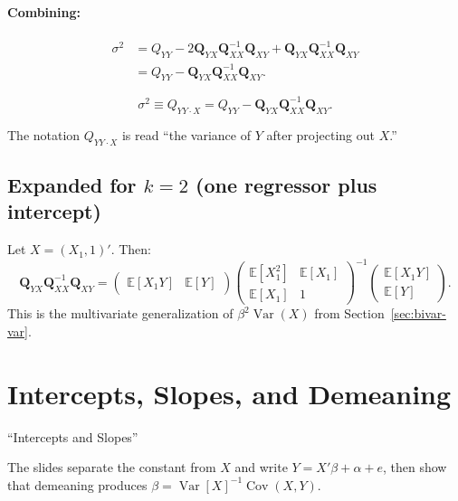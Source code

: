 \documentclass[12pt]{article}
\newcommand{\E}{\mathbb{E}}
\newcommand{\Var}{\operatorname{Var}}
\newcommand{\Cov}{\operatorname{Cov}}
\newcommand{\bfQ}{\mathbf{Q}}
\theoremstyle{definition}
\begin{document}
\paragraph{Combining:}
\begin{align*}
\sigma^2 &= Q_{YY} - 2\bfQ_{YX}\bfQ_{XX}^{-1}\bfQ_{XY} + \bfQ_{YX}\bfQ_{XX}^{-1}\bfQ_{XY}\\
&= Q_{YY} - \bfQ_{YX}\bfQ_{XX}^{-1}\bfQ_{XY}.
\end{align*}

\begin{equation}
\boxed{\sigma^2 \equiv Q_{YY \cdot X} = Q_{YY} - \bfQ_{YX}\bfQ_{XX}^{-1}\bfQ_{XY}.}
\end{equation}

The notation $Q_{YY\cdot X}$ is read ``the variance of $Y$ after projecting out $X$.''

\subsection{Expanded for $k=2$ (one regressor plus intercept)}

Let $X = (X_1, 1)'$. Then:
\[
\bfQ_{YX}\bfQ_{XX}^{-1}\bfQ_{XY} =
\begin{pmatrix} \E[X_1 Y] & \E[Y] \end{pmatrix}
\begin{pmatrix} \E[X_1^2] & \E[X_1] \\ \E[X_1] & 1 \end{pmatrix}^{-1}
\begin{pmatrix} \E[X_1 Y] \\ \E[Y] \end{pmatrix}.
\]
This is the multivariate generalization of $\beta^2\Var(X)$ from Section~\ref{sec:bivar-var}.


\section{Intercepts, Slopes, and Demeaning}
\label{sec:demeaning}

\begin{tcolorbox}[colback=blue!5, colframe=blue!50, title=Slide Reference]
``Intercepts and Slopes''
\end{tcolorbox}

The slides separate the constant from $X$ and write $Y = X'\beta + \alpha + e$, then show that demeaning produces $\beta = \Var[X]^{-1}\Cov(X,Y)$.
\end{document}
